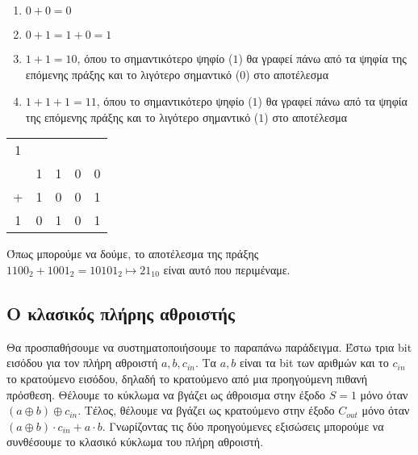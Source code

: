 \begin{enumerate}
  \item $0 + 0 = 0$
  \item $0 + 1 = 1 + 0 = 1$
  \item $1 + 1 = 10$, όπου το σημαντικότερο ψηφίο ($1$) θα γραφεί
  πάνω από τα ψηφία της επόμενης πράξης και το λιγότερο σημαντικό ($0$)
  στο αποτέλεσμα
  \item $1 + 1 + 1 = 11$, όπου το σημαντικότερο ψηφίο ($1$) θα γραφεί
  πάνω από τα ψηφία της επόμενης πράξης και το λιγότερο σημαντικό ($1$)
  στο αποτέλεσμα
\end{enumerate}

\begin{center}
  \begin{tabular}{c@{\,}c@{\,}c@{\,}c@{\,}c}
    1 &   &   &   &   \\
      & 1 & 1 & 0 & 0 \\
    + & 1 & 0 & 0 & 1 \\
    \hline
    1 & 0 & 1 & 0 & 1 \\
    \end{tabular}
\end{center}

Όπως μπορούμε να δούμε, το αποτέλεσμα της πράξης $1100_2 + 1001_2 = 10101_2 \mapsto 21_{10}$
είναι αυτό που περιμέναμε.

\subsection{Ο κλασικός πλήρης αθροιστής}

Θα προσπαθήσουμε να συστηματοποιήσουμε το παραπάνω παράδειγμα. Έστω τρια
bit εισόδου για τον πλήρη αθροιστή $a, b, c_{in}$. Τα $a, b$ είναι τα bit
των αριθμών και το $c_{in}$ το κρατούμενο εισόδου, δηλαδή το κρατούμενο από
μια προηγούμενη πιθανή πρόσθεση. Θέλουμε το κύκλωμα να βγάζει ως άθροισμα
στην έξοδο $S = 1$ μόνο όταν $(a \oplus b) \oplus c_{in}$. Τέλος, θέλουμε
να βγάζει ως κρατούμενο στην έξοδο $C_{out}$ μόνο όταν $(a \oplus b) \cdot c_{in} + a \cdot b$.
Γνωρίζοντας τις δύο προηγούμενες εξισώσεις μπορούμε να συνθέσουμε το κλασικό
κύκλωμα του πλήρη αθροιστή.\\

